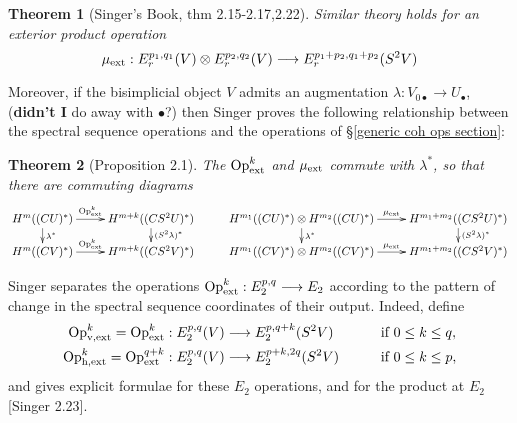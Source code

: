 \documentclass[11pt]{amsart}
\theoremstyle{plain}
\newtheorem{thm}{Theorem}[section]
\theoremstyle{definition}
\renewcommand{\to}{\longrightarrow}
\theoremstyle{plain}
\newcommand{\ExtCohOp}{\textup{Op}_\textup{ext}}
\newcommand{\vExtCohOp}{\textup{Op}_\textup{v,ext}}
\newcommand{\hExtCohOp}{\textup{Op}_\textup{h,ext}}
\newcommand{\ExtCohProd}{\mu_\textup{ext}}
\newcommand{\Sq}{\mathrm{Sq}}
\begin{document}
\begin{Composite functor spectral sequences}
\begin{thm}[Singer's Book, thm 2.15-2.17,2.22]
Similar theory holds for an exterior product operation
\[\ExtCohProd:E_r^{p_1,q_1}(V)\otimes E_r^{p_2,q_2}(V)\to E_r^{p_1+p_2,q_1+p_2}(S^2V)\]
\end{thm}
Moreover, if the bisimplicial object $V$ admits an augmentation $\lambda:V_{0\bullet}\to U_{\bullet}$, (\textbf{didn't I} do away with $\bullet$?) then %
Singer proves the following relationship between the spectral sequence operations and the operations of \S\ref{generic coh ops section}:
\begin{thm}[Proposition 2.1]
The $\ExtCohOp^k$ and $\ExtCohProd$ commute with $\lambda^*$, so that there are commuting diagrams
\[\xymatrix@R=4mm{
H^{m}((CU)^*)\ar[r]^-{\ExtCohOp^k}
\ar[d]^-{\lambda^*}
&%
H^{m+k}((CS^2U)^*)\ar[d]^-{(S^2\lambda)^*}
&%
H^{m_1}((CU)^*)\otimes H^{m_2}((CU)^*)\ar[r]^-{\ExtCohProd}
\ar[d]^-{\lambda^*}
&%
H^{m_1+m_2}((CS^2U)^*)\ar[d]^-{(S^2\lambda)^*}
\\%
H^{m}((CV)^*)\ar[r]^-{\ExtCohOp^k}
&%
H^{m+k}((CS^2V)^*)
&%
H^{m_1}((CV)^*)\otimes H^{m_2}((CV)^*)\ar[r]^-{\ExtCohProd}
&%
H^{m_1+m_2}((CS^2V)^*)
}\]
\end{thm}

Singer separates the operations $\ExtCohOp^k:E^{p,q}_2\to E_{2}$ according to the pattern of change in the spectral sequence coordinates of their output. Indeed, define
\begin{alignat*}{2}
\vExtCohOp^k=\ExtCohOp^k:E^{p,q}_2(V)&\to E^{p,q+k}_2(S^2V)&\qquad&\text{if }0\leq k \leq q,\\
\hExtCohOp^k=\ExtCohOp^{q+k}:E^{p,q}_2(V)&\to E^{p+k,2q}_2(S^2V)&\qquad&\text{if }0\leq k \leq p,
\end{alignat*}
and gives explicit formulae for these $E_2$ operations, and for the product at $E_2$ [Singer 2.23].



\end{Composite functor spectral sequences}
\end{document}

